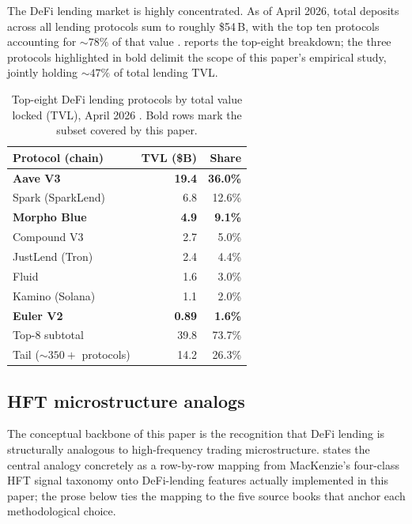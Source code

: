 The DeFi lending market is highly concentrated.  As of April 2026,
total deposits across all lending protocols sum to roughly
\$54\,B, with the top ten protocols accounting for $\sim 78\%$ of
that value \cite{defillama2026snapshot}.  
reports the top-eight breakdown; the three protocols highlighted
in bold delimit the scope of this paper's empirical study, jointly
holding $\sim 47\%$ of total lending TVL.

\begin{table}[t]
  \centering
  \caption{Top-eight DeFi lending protocols by total value locked
    (TVL), April 2026 \cite{defillama2026snapshot}.  Bold rows mark
    the subset covered by this paper.}
  \label{tab:lending-tvl}
  \begin{tabular}{lrr}
    \toprule
    Protocol (chain)            & TVL (\$B) & Share \\
    \midrule
    \textbf{Aave V3}            & \textbf{19.4} & \textbf{36.0\%} \\
    Spark (SparkLend)           & 6.8           & 12.6\% \\
    \textbf{Morpho Blue}        & \textbf{4.9}  & \textbf{9.1\%}  \\
    Compound V3                 & 2.7           & 5.0\% \\
    JustLend (Tron)             & 2.4           & 4.4\%  \\
    Fluid                       & 1.6           & 3.0\%  \\
    Kamino (Solana)             & 1.1           & 2.0\%  \\
    \textbf{Euler V2}           & \textbf{0.89} & \textbf{1.6\%}  \\
    \midrule
    Top-8 subtotal              & 39.8          & 73.7\% \\
    Tail ($\sim 350+$ protocols)& 14.2          & 26.3\% \\
    \bottomrule
  \end{tabular}
\end{table}

\subsection{HFT microstructure analogs}
\label{sec:bg-hft}

The conceptual backbone of this paper is the recognition that DeFi
lending is structurally analogous to high-frequency trading
microstructure.   states the central
analogy concretely as a row-by-row mapping from MacKenzie's
four-class HFT signal taxonomy onto DeFi-lending features actually
implemented in this paper; the prose below ties the mapping to
the five source books that anchor each methodological choice.

